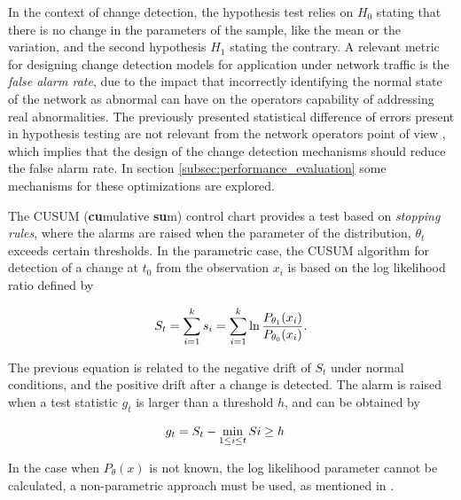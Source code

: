 \par In the context of change detection, the hypothesis test relies on $H_0$ stating that there is no change in the parameters of the sample, like the mean or the
variation, and the second hypothesis $H_1$ stating the contrary. A relevant metric for designing change detection models for application under network traffic is the
\textit{false alarm rate}, due to the impact that incorrectly identifying the normal state of the network as abnormal can have on the operators capability of 
addressing real abnormalities. The previously presented statistical difference of errors present in hypothesis testing are not relevant from the network operators
point of view \cite{munz_traffic_2010},
which implies that the design of the change detection mechanisms should reduce the false alarm rate. In section \ref{subsec:performance_evaluation} some mechanisms
for these optimizations are explored.

\par The CUSUM (\textbf{cu}mulative \textbf{su}m) control chart provides a test based on \textit{stopping rules}, where the alarms are raised when the parameter
of the distribution, $\theta_t$ exceeds certain thresholds. In the parametric case, the CUSUM algorithm for detection of a change at $t_0$ from the observation
$x_i$ is based on the log likelihood ratio defined by \cite {https://eprints.qut.edu.au/20572/3/ahmed2008npc.pdf}

\begin{equation*}
\centering
    S_t = \sum_{i=1}^k s_i = \sum_{i=1}^k\ln \frac {P_{\theta_1}(x_i)} {P_{\theta_0}(x_i)}.
\end{equation*}

\par The previous equation is related to the negative drift of $S_t$ under normal conditions, and the positive drift after a change is detected. The alarm is raised when a test statistic $g_t$ is larger than a threshold $h$, and can be obtained by 

\begin{equation*}
\centering
    \begin{split}
        &g_t = S_t - \min_{1 \leq i \leq t} Si \geq h
    \end{split}
\end{equation*}

\par In the case when $P_{\theta}(x)$ is not known, the log likelihood parameter cannot be calculated, a non-parametric approach must be used, as mentioned in \cite{
ahmed_novel_2008}.  

